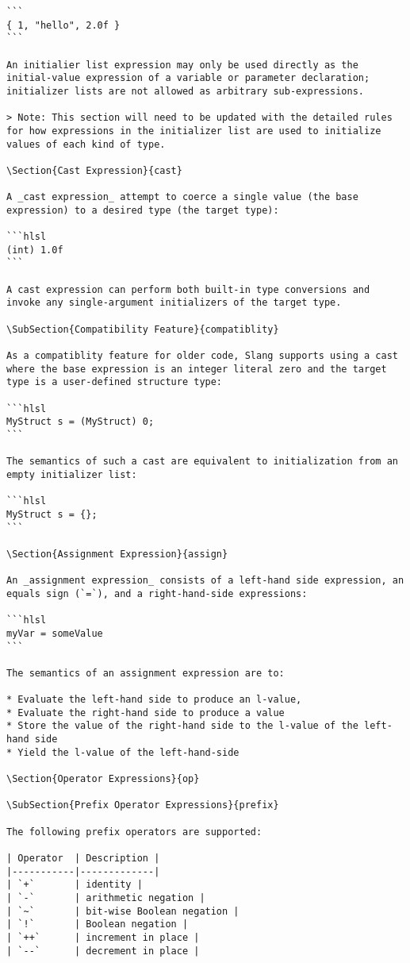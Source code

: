 \begin{verbatim}
```
{ 1, "hello", 2.0f }
```

An initialier list expression may only be used directly as the initial-value expression of a variable or parameter declaration; initializer lists are not allowed as arbitrary sub-expressions.

> Note: This section will need to be updated with the detailed rules for how expressions in the initializer list are used to initialize values of each kind of type.

\Section{Cast Expression}{cast}

A _cast expression_ attempt to coerce a single value (the base expression) to a desired type (the target type):

```hlsl
(int) 1.0f
```

A cast expression can perform both built-in type conversions and invoke any single-argument initializers of the target type.

\SubSection{Compatibility Feature}{compatiblity}

As a compatiblity feature for older code, Slang supports using a cast where the base expression is an integer literal zero and the target type is a user-defined structure type:

```hlsl
MyStruct s = (MyStruct) 0;
```

The semantics of such a cast are equivalent to initialization from an empty initializer list:

```hlsl
MyStruct s = {};
```

\Section{Assignment Expression}{assign}

An _assignment expression_ consists of a left-hand side expression, an equals sign (`=`), and a right-hand-side expressions:

```hlsl
myVar = someValue
```

The semantics of an assignment expression are to:

* Evaluate the left-hand side to produce an l-value,
* Evaluate the right-hand side to produce a value
* Store the value of the right-hand side to the l-value of the left-hand side
* Yield the l-value of the left-hand-side

\Section{Operator Expressions}{op}

\SubSection{Prefix Operator Expressions}{prefix}

The following prefix operators are supported:

| Operator 	| Description |
|-----------|-------------|
| `+`		| identity |
| `-`		| arithmetic negation |
| `~` 		| bit-wise Boolean negation |
| `!`		| Boolean negation |
| `++`		| increment in place |
| `--`		| decrement in place |


\end{verbatim}
